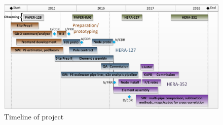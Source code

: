 \documentclass[preprint]{aastex}
\begin{document}

\begin{figure}[t]\centering
\includegraphics[width=5.5in]{otherdocs/schedule.png}
\caption{\small Timeline of project}
\label{fig:timeline}
\end{figure}
\end{document}
